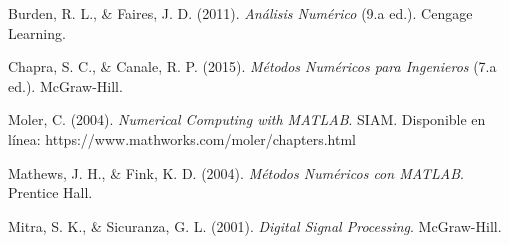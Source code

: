 \documentclass[12pt,a4paper,twoside]{article}  %
\begin{document}
\begin{thebibliography}{99}

    Burden, R. L., \& Faires, J. D. (2011). \textit{Análisis Numérico} (9.a ed.). Cengage Learning.
    
    Chapra, S. C., \& Canale, R. P. (2015). \textit{Métodos Numéricos para Ingenieros} (7.a ed.). McGraw-Hill.
    
    Moler, C. (2004). \textit{Numerical Computing with MATLAB}. SIAM. Disponible en línea: https://www.mathworks.com/moler/chapters.html
    
    Mathews, J. H., \& Fink, K. D. (2004). \textit{Métodos Numéricos con MATLAB}. Prentice Hall.
    
    Mitra, S. K., \& Sicuranza, G. L. (2001). \textit{Digital Signal Processing}. McGraw-Hill.
    
\end{thebibliography}
    












\end{document}
